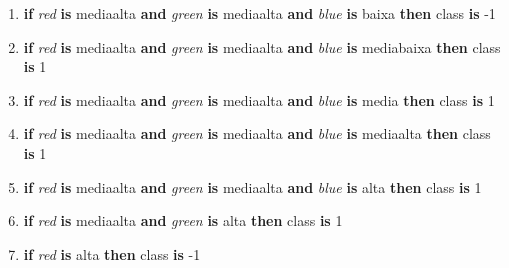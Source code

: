 \begin{enumerate}[itemsep=0mm]
\item \textbf{if} \emph{red} \textbf{is} mediaalta  \textbf{and} \emph{green} \textbf{is} mediaalta  \textbf{and} \emph{blue} \textbf{is} baixa \textbf{then} class \textbf{is} -1
\item \textbf{if} \emph{red} \textbf{is} mediaalta  \textbf{and} \emph{green} \textbf{is} mediaalta  \textbf{and} \emph{blue} \textbf{is} mediabaixa \textbf{then} class \textbf{is} 1
\item \textbf{if} \emph{red} \textbf{is} mediaalta  \textbf{and} \emph{green} \textbf{is} mediaalta  \textbf{and} \emph{blue} \textbf{is} media \textbf{then} class \textbf{is} 1
\item \textbf{if} \emph{red} \textbf{is} mediaalta  \textbf{and} \emph{green} \textbf{is} mediaalta  \textbf{and} \emph{blue} \textbf{is} mediaalta \textbf{then} class \textbf{is} 1
\item \textbf{if} \emph{red} \textbf{is} mediaalta  \textbf{and} \emph{green} \textbf{is} mediaalta  \textbf{and} \emph{blue} \textbf{is} alta \textbf{then} class \textbf{is} 1
\item \textbf{if} \emph{red} \textbf{is} mediaalta  \textbf{and} \emph{green} \textbf{is} alta \textbf{then} class \textbf{is} 1
\item \textbf{if} \emph{red} \textbf{is} alta \textbf{then} class \textbf{is} -1
\end{enumerate}
